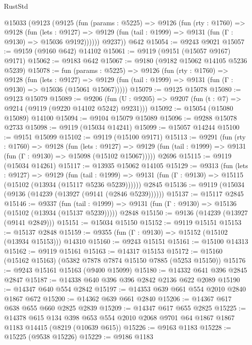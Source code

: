 \begin{lexlean}{RustStd}
\begin{coremodule}
    @15033
      (@9123
        (@9125
          (fun (params : @5225) =>
          @9126
            (fun (rty : @1760) =>
            @9128
              (fun (lets : @9127) =>
              @9129 (fun (tail : @1999) => @9131 (fun (Γ : @9130) => @15036 @9192))))))
        @9237))
    @642
@15054 := @9243 @9021
@15057 := @9159 (@9160 @642) @14102
@15061 := @9119 (@9151 (@15057 @9167) @9171)
@15062 := @9183 @642
@15067 := @9180 (@9182 @15062 @14105 @5236 @5239)
@15078 := fun (params : @5225) =>
  @9126
    (fun (rty : @1760) =>
    @9128
      (fun (lets : @9127) =>
      @9129 (fun (tail : @1999) => @9131 (fun (Γ : @9130) => @15036 (@15061 @15067)))))
@15079 := @9125 @15078
@15080 := @9123 @15079
@15089 := @9206
    (fun (U : @9205) => @9207 (fun (t : @7) => @9214 (@9119 (@9220 @14102 @5242) @9231)))
@15092 := @15054 (@15080 @15089) @14100
@15094 := @9104 @15079 @15089
@15096 := @9288 @15078 @2733
@15098 := @9119 (@15034 @14241)
@15099 := @15057 @14244
@15100 := @9151 @15099
@15102 := @9119 (@15100 @9171)
@15113 := @9291
    (fun (rty : @1760) =>
    @9128
      (fun (lets : @9127) =>
      @9129 (fun (tail : @1999) => @9131 (fun (Γ : @9130) => @15098 (@15102 @15067)))))
    @2696
@15115 := @9119 (@15034 @14261)
@15117 := @13935 @15062 @14105
@15129 := @9313
    (fun (lets : @9127) =>
    @9129
      (fun (tail : @1999) =>
      @9131 (fun (Γ : @9130) => @15115 (@15102 (@13934 (@15117 @5236 @5239))))))
    @2845
@15136 := @9119 (@15034 (@9136 (@14239 (@13927 (@9141 (@2846 @5239))))))
@15137 := @15117 @2845
@15146 := @9337
    (fun (tail : @1999) => @9131 (fun (Γ : @9130) => @15136 (@15102 (@13934 (@15137 @5239)))))
    @2848
@15150 := @9136 (@14239 (@13927 (@9141 @2849)))
@15151 := @15034 @15150
@15152 := @9119 @15151
@15153 := @15137 @2848
@15159 := @9355 (fun (Γ : @9130) => @15152 (@15102 (@13934 @15153))) @14310
@15160 := @9243 @15151
@15161 := @15100 @14313
@15162 := @9119 @15161
@15163 := @14317 @15153
@15172 := @15160 (@15162 @15163) (@5382 @7878 @7874 @15150 @7885 (@5253 @15150))
@15176 := @9243 @15161 @15163 (@9400 @15099)
@15180 := @14332 @641 @396 @2845 @2847
@15187 := @14338 @640 @396 @396 @2842 @2136 @622 @2089
@15190 := @14347 @640 @554 @2842
@15197 := @14353 @639 @661 @554 @2010 @2840 @1867 @672
@15200 := @14362 @639 @661 @2840
@15206 := @14367 @617 @638 @655 @660 @2825 @2839
@15209 := @14347 @617 @655 @2825
@15225 := @14378
    @615
    @134
    @398
    @653
    @554
    @2010
    @2068
    @9701
    @64
    @1867
    @1867
    @1183
    @14415
    (@8219 (@10639 @615))
@15226 := @9163 @1183
@15228 := @15225 (@9538 @15226)
@15229 := @9186 @1183

\end{coremodule}
\end{lexlean}
